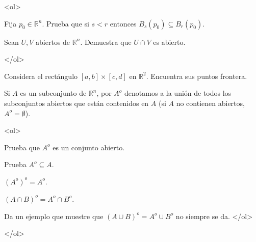 \documentclass{article}
\theoremstyle{definition}
\begin{document}
\item 
	<ol>
	\item Fija $p_0\in \mathbb{R}^n$. Prueba que si $s<r$ entonces $B_s(p_0) \subseteq B_r(p_0)$.
	
	\item Sean $U, V$ abiertos de $\mathbb{R}^n$. Demuestra que $U\cap V$ es abierto.
	
	</ol>

	\item Considera el rectángulo $[a,b]\times [c,d]$ en $\mathbb{R}^2$. Encuentra sus puntos frontera.	
	
	\item Si $A $ es un subconjunto de $\mathbb{R}^n$, por $A^o$ denotamos a la unión de todos los subconjuntos
	abiertos que están contenidos en $A$ (si $A$ no contienen abiertos, $A^o=\emptyset$). 
	
	<ol> 
	\item Prueba  que
	$A^o$ es un conjunto abierto. 

	\item Prueba $A^o \subseteq A$.
	\item $(A^o)^o=A^o$.
	\item $(A\cap B)^o=A^o \cap B^o$.
	\item Da un ejemplo que muestre que $(A\cup B)^o=A^o\cup B^o$ no siempre se da.
</ol>	

  </ol>
  


  
       
\end{document}
